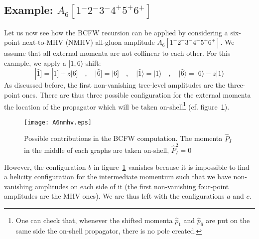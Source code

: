 \subsection*{Example: $A_6[1^-2^-3^-4^+5^+6^+]$}
Let us now see how the BCFW recursion can be applied by considering a six-point next-to-MHV (NMHV) all-gluon amplitude $A_6[1^-2^-3^-4^+5^+6^+]$.
We assume that all external momenta are not collinear to each other.
For this example, we apply a $[1,6\rangle$-shift:
\begin{equation}
|\hat{1}] = |1] + z|6]
\quad,\quad
|\hat{6}] = |6]
\quad,\quad
|\hat{1}\rangle = |1\rangle
\quad,\quad
|\hat{6}\rangle = |6\rangle - z|1\rangle
\end{equation}
As discussed before, the first non-vanishing tree-level amplitudes are the three-point ones. 
There are thus three possible configuration for the external momenta \wrt the location of the propagator which will be taken on-shell\footnote{One can check that, whenever the shifted momenta $\hat{p}_1$ and $\hat{p}_6$ are put on the same side \wrt the on-shell propagator, there is no pole created.} (cf. figure~\ref{fig_A6nmhv}).
\begin{figure}[h]
  \centering
  \texttt{[image: A6nmhv.eps]}
  \caption{Possible contributions in the BCFW computation. The momenta $\hat{P}_I$ in the middle of each graphs are taken on-shell, \ie $\hat{P}_I^2=0$}
  \label{fig_A6nmhv}
\end{figure}
However, the configuration $b$ in figure~\ref{fig_A6nmhv} vanishes because it is impossible to find a helicity configuration for the intermediate momentum such that we have non-vanishing amplitudes on each side of it (the first non-vanishing four-point amplitudes are the MHV ones).
We are thus left with the configurations $a$ and $c$.
%
